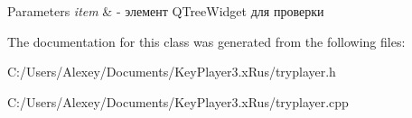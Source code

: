 \begin{DoxyParams}{Parameters}
{\em item} & -\/ элемент Q\+Tree\+Widget для проверки \\
\hline
\end{DoxyParams}


The documentation for this class was generated from the following files\+:\begin{DoxyCompactItemize}
\item 
C\+:/\+Users/\+Alexey/\+Documents/\+Key\+Player3.\+x\+Rus/tryplayer.\+h\item 
C\+:/\+Users/\+Alexey/\+Documents/\+Key\+Player3.\+x\+Rus/tryplayer.\+cpp\end{DoxyCompactItemize}
